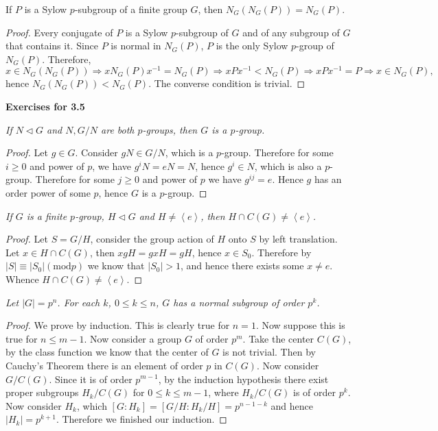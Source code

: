 \begin{theorem}
If $P$ is a Sylow $p$-subgroup of a finite group $G$, then $N_G(N_G(P))=N_G(P)$.
\end{theorem}
\begin{proof}
Every conjugate of $P$ is a Sylow $p$-subgroup of $G$ and of any subgroup of $G$ that contains it. Since $P$ is normal in $N_G(P)$, $P$ is the only Sylow $p$-group of $N_G(P)$. Therefore, 
$$x\in N_G(N_G(P))\Rightarrow xN_G(P)x^{-1}=N_G(P)\Rightarrow xPx^{-1}<N_G(P)\Rightarrow xPx^{-1}=P\Rightarrow x\in N_G(P),$$
hence $N_G(N_G(P))<N_G(P)$. The converse condition is trivial.
\end{proof}
\begin{center}
\begin{large}
    \textbf{Exercises for 3.5}
\end{large}
\end{center}
\begin{problem}\em
If $N\lhd G$ and $N,G/N$ are both $p$-groups, then $G$ is a $p$-group.
\end{problem}
\begin{proof}
Let $g\in G$. Consider $gN\in G/N$, which is a $p$-group. Therefore for some $i\ge 0$ and power of $p$, we have $g^iN=eN=N$, hence $g^i\in N$, which is also a $p$-group. Therefore for some $j\ge 0$ and power of $p$ we have $g^{ij}=e$. Hence $g$ has an order power of some $p$, hence $G$ is a $p$-group.
\end{proof}
\begin{problem}\em
If $G$ is a finite $p$-group, $H\lhd G$ and $H\ne\left<e\right>$, then $H\cap C(G)\ne\left<e\right>$.
\end{problem}
\begin{proof}
Let $S=G/H$, consider the group action of $H$ onto $S$ by left translation. Let $x\in H\cap C(G)$, then $xgH=gxH=gH$, hence $x\in S_0$. Therefore by $|S|\equiv|S_0|(\mathrm{mod}p)$ we know that $|S_0|>1$, and hence there exists some $x\ne e$. Whence $H\cap C(G)\ne\left<e\right>$.
\end{proof}
\begin{problem}\em
Let $|G|=p^n$. For each $k$, $0\le k\le n$, $G$ has a normal subgroup of order $p^k$.
\end{problem}
\begin{proof}
We prove by induction. This is clearly true for $n=1$. Now suppose this is true for $n\le m-1$. Now consider a group $G$ of order $p^m$. Take the center $C(G)$, by the class function we know that the center of $G$ is not trivial. Then by Cauchy's Theorem there is an element of order $p$ in $C(G)$. Now consider $G/C(G)$. Since it is of order $p^{m-1}$, by the induction hypothesis there exist proper subgroups $H_k/C(G)$ for $0\le k\le m-1$, where $H_k/C(G)$ is of order $p^k$. Now consider $H_k$, which $[G:H_k]=[G/H:H_k/H]=p^{n-1-k}$ and hence $|H_k|=p^{k+1}$. Therefore we finished our induction.
\end{proof}
